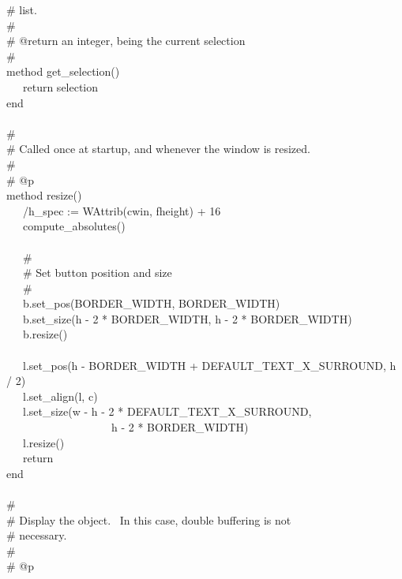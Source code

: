 {\>   \# list. \\
\>   \# \\
\>   \# @return an integer, being the current selection \\
\>   \# \\
\>   method get\_selection() \\
\>   \ \ \ return selection \\
\>   end \\
\ \\
\>   \# \\
\>   \# Called once at startup, and whenever the window is resized. \\
\>   \# \\
\>   \# @p \\
\>   method resize() \\
\>   \ \ \ /h\_spec := WAttrib(cwin,
{\textquotedbl}fheight{\textquotedbl}) + 16 \\
\>   \ \ \ compute\_absolutes() \\
\ \\
\>   \ \ \ \# \\
\>   \ \ \ \# Set button position and size \\
\>   \ \ \ \# \\
\>   \ \ \ b.set\_pos(BORDER\_WIDTH, BORDER\_WIDTH) \\
\>   \ \ \ b.set\_size(h - 2 * BORDER\_WIDTH, h - 2 *
BORDER\_WIDTH) \\
\>   \ \ \ b.resize() \\
\ \\
\>   \ \ \ l.set\_pos(h - BORDER\_WIDTH +
DEFAULT\_TEXT\_X\_SURROUND, h / 2) \\
\>   \ \ \ l.set\_align({\textquotedbl}l{\textquotedbl},
{\textquotedbl}c{\textquotedbl}) \\
\>   \ \ \ l.set\_size(w - h - 2 *
DEFAULT\_TEXT\_X\_SURROUND, \\
\>   \ \ \ \ \ \ \ \ \ \ \ \ \ \ \ \ \ \ \ h - 2 * BORDER\_WIDTH) \\
\>   \ \ \ l.resize() \\
\>   \ \ \ return \\
\>   end \\
\ \\
\>   \# \\
\>   \# Display the object. \ In this case, double buffering is not \\
\>   \# necessary. \\
\>   \# \\
\>   \# @p \\
}
